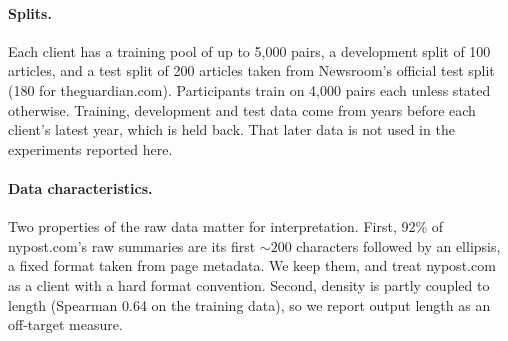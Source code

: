 \documentclass[11pt]{article}
\begin{document}
\paragraph{Splits.}
Each client has a training pool of up to 5{,}000 pairs, a development split of 100 articles, and a test split of 200 articles taken from Newsroom's official test split (180 for theguardian.com).
Participants train on 4{,}000 pairs each unless stated otherwise.
Training, development and test data come from years before each client's latest year, which is held back.
That later data is not used in the experiments reported here.

\paragraph{Data characteristics.}
Two properties of the raw data matter for interpretation.
First, 92\% of nypost.com's raw summaries are its first ${\sim}200$ characters followed by an ellipsis, a fixed format taken from page metadata.
We keep them, and treat nypost.com as a client with a hard format convention.
Second, density is partly coupled to length (Spearman 0.64 on the training data), so we report output length as an off-target measure.
\end{document}
